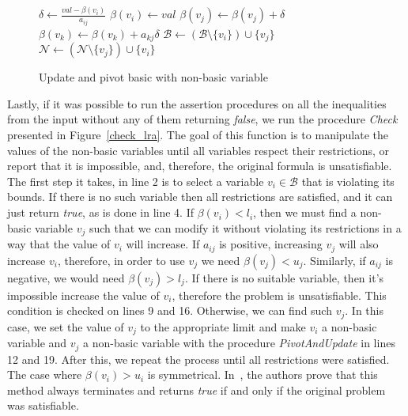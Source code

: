 \begin{figure}[t]
\begin{algorithmic}[1]
    \State $\delta \gets \frac{val - \beta(v_{i})}{a_{ij}}$
    \State $\beta(v_{i}) \gets val$
    \State $\beta(v_{j}) \gets \beta(v_{j}) + \delta$
      \State~$\beta(v_{k}) \gets \beta(v_{k}) + a_{kj}\delta$
    \EndFor
    \State $\mathcal{B} \gets (\mathcal{B} \setminus \{v_{i}\}) \cup \{v_{j}\}$
    \State $\mathcal{N} \gets (\mathcal{N} \setminus \{v_{j}\}) \cup \{v_{i}\}$
  \EndProcedure
\end{algorithmic}
\caption{Update and pivot basic with non-basic variable}
\end{figure}

Lastly, if it was possible to run the assertion procedures on all the inequalities from the input without any of them returning \textit{false}, we run the procedure \textit{Check} presented in Figure~\ref{check_lra}. The goal of this function is to manipulate the values of the non-basic variables until all variables respect their restrictions, or report that it is impossible, and, therefore, the original formula is unsatisfiable. The first step it takes, in line 2 is to select a variable $v_{i} \in \mathcal{B}$ that is violating its bounds. If there is no such variable then all restrictions are satisfied, and it can just return \textit{true}, as is done in line 4. If $\beta(v_{i}) < l_{i}$, then we must find a non-basic variable $v_{j}$ such that we can modify it without violating its restrictions in a way that the value of $v_{i}$ will increase. If $a_{ij}$ is positive, increasing $v_{j}$ will also increase $v_{i}$, therefore, in order to use $v_{j}$ we need $\beta(v_{j}) < u_{j}$. Similarly, if $a_{ij}$ is negative, we would need $\beta(v_{j}) > l_{j}$. If there is no suitable variable, then it's impossible increase the value of $v_{i}$, therefore the problem is unsatisfiable. This condition is checked on lines 9 and 16. Otherwise, we can find such $v_{j}$. In this case, we set the value of $v_{j}$ to the appropriate limit and make $v_{i}$ a non-basic variable and $v_{j}$ a non-basic variable with the procedure \textit{PivotAndUpdate} in lines 12 and 19. After this, we repeat the process until all restrictions were satisfied. The case where $\beta(v_{i}) > u_{i}$ is symmetrical. In~\cite{simplex_dpllt}, the authors prove that this method always terminates and returns \textit{true} if and only if the original problem was satisfiable.

